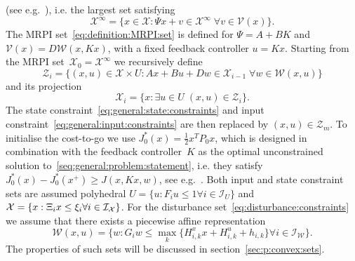 \documentclass[journal]{IEEEtran}
\theoremstyle{remark}
\theoremstyle{definition}
\begin{document}
(see e.g.~\cite{blanchini:2007}), i.e. the largest set satisfying
%
\begin{equation}\label{eq:definition:MRPI:set}
  \mathcal X^\infty = \{x\in\mathcal X: \Psi x + v \in\mathcal X^\infty\;\forall v\in\mathcal V(x)\}.
\end{equation}
%
The MRPI set~\eqref{eq:definition:MRPI:set} is defined for $\Psi=A+BK$ and $\mathcal V(x) = D\mathcal W(x,Kx)$,
with a fixed feedback controller $u = Kx$.
%
Starting from the MRPI set~$\mathcal X_0=\mathcal X^\infty$ we recursively define
%
\begin{equation}\label{eq:stage:constraints:in:x:and:u}
  \mathcal Z_i = \{(x,u)\in\mathcal X\times U: Ax + Bu + Dw \in\mathcal X_{i-1}\;\forall w\in\mathcal W(x,u)\}
\end{equation}
%
and its projection
%
\begin{equation}
  \mathcal X_i = \{x:\exists u\in U\; (x,u)\in\mathcal Z_i\}.
\end{equation}
%
The state constraint~\eqref{eq:general:state:constraints} and input constraint~\eqref{eq:general:input:constraints}
are then replaced by $(x,u)\in\mathcal Z_m$.
%
To initialise the cost-to-go we use $J_0^\ast(x) = \frac{1}{2}x^T P_0x$, which is designed in combination with the feedback 
controller~$K$ as the optimal unconstrained solution to~\eqref{seq:general:problem:statement}, i.e. they satisfy
$J_0^\ast(x) - J_0^\ast(x^+)\geq J(x,Kx,w)$, see e.g.~\cite{Boyd:94}.
%
Both input and state constraint sets are assumed polyhedral $U=\{u:F_iu\leq1\forall i\in\mathcal I_U\}$ and $\mathcal X = 
\{x:\Xi_i x\leq \xi_i\forall i\in\mathcal I_{\mathcal X}\}$.
%
For the disturbance set~\eqref{eq:disturbance:constraints} we assume that there exists a piecewise affine representation
%
\begin{equation}\label{eq:definition:disturbance:set:explicit}
  \mathcal W(x,u) = \{w:G_i w\leq\max_{k}\{H_{i,k}^x x + H_{i,k}^u + h_{i,k}\}\forall i\in\mathcal I_{\mathcal W}\}.
\end{equation}
%
The properties of such sets will be discussed in section~\ref{sec:p:convex:sets}.
%
%
%
%
\end{document}
